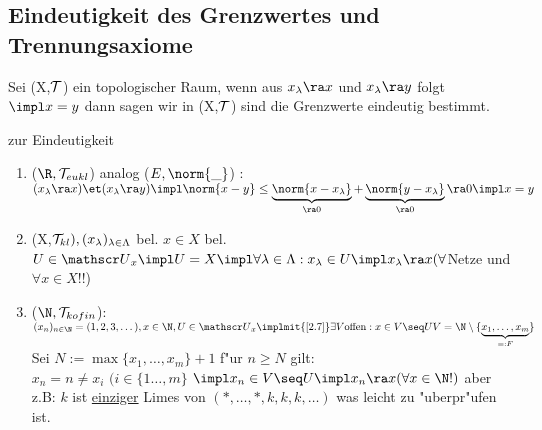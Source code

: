 \subsection{Eindeutigkeit des Grenzwertes und Trennungsaxiome}
Sei (X,$\mathcal T$) ein topologischer Raum, wenn aus $x_\lambda\ra x$ und $x_\lambda\ra y$ folgt $\impl x=y$ dann sagen wir in (X,$\mathcal T$) sind die Grenzwerte eindeutig bestimmt.
\begin{beispiel}\label{3.13}zur Eindeutigkeit
\begin{enumerate}
\item ($\R ,\T_{eukl}$) analog ($E,\norm{\_}$) :\\
$(x_\lambda\ra x) \et (x_\lambda\ra y)\impl\norm{x-y}\leq\underbrace{\norm{x-x_\lambda}}_{\ra 0}+\underbrace{\norm{y-x_\lambda}}_{\ra 0}\ra 0\impl x=y$
\item (X,$\mathcal T_{kl}), (x_\lambda )_{\lambda\in\Lambda}$ bel. $x\in X$ bel.\\
$U\in\umg{U}{x}\impl U=X\impl\forall\lambda\in\Lambda :x_\lambda\in U\impl x_\lambda \ra x (\forall $Netze und $\forall x\in X$!!)
\item ($\N ,\T_{kofin}$): $(x_n)_{n\in\N} = (1,2,3,\dots ), x\in\N ,U\in\umg{U}{x}\implmit{\ref{2.7}}\exists V\mbox{offen} : x\in V\seq U\\
V=\N\setminus\{\underbrace{x_1,\dots,x_m}_{=:F}\}$ Sei $N:=\max\{ x_1,\dots ,x_m\} +1$ f"ur $n\geq N$ gilt:\\
$x_n=n\neq x_i$ {\scriptsize $(i\in\{ 1\dots ,m\}$} $\impl x_n \in V\seq U\impl x_n\ra x (\forall x\in\N !)$ aber z.B: $k$ ist \ul{einziger} Limes von $(\ast ,\dots ,\ast , k, k, k,\dots )$ was leicht zu "uberpr"ufen ist.
\end{enumerate}
\end{beispiel}

